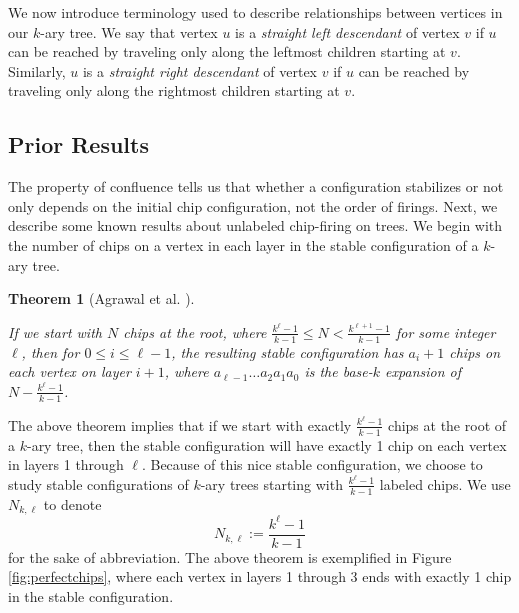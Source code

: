 \documentclass[11pt]{article}
\newtheorem{theorem}{Theorem}[section]
\theoremstyle{remark}
\theoremstyle{definition}
\begin{document}
We now introduce terminology used to describe relationships between vertices in our $k$-ary tree. We say that vertex $u$ is a \textit{straight left descendant} of vertex $v$ if $u$ can be reached by traveling only along the leftmost children starting at $v$. Similarly, $u$ is a \textit{straight right descendant} of vertex $v$ if $u$ can be reached by traveling only along the rightmost children starting at $v$.

\subsection{Prior Results}



The property of confluence tells us that whether a configuration stabilizes or not only depends on the initial chip configuration, not the order of firings. Next, we describe some known results about unlabeled chip-firing on trees. We begin with the number of chips on a vertex in each layer in the stable configuration of a $k$-ary tree.

\begin{theorem}[Agrawal et al. \cite{agrawal2025chipfiringinfinitekarytrees}]\label{endingconfig}

If we start with $N$ chips at the root, where $\frac{k^\ell-1}{k-1} \le N < \frac{k^{\ell+1}-1}{k-1}$ for some integer $\ell$, then for $0 \le i \le \ell-1$, the resulting stable configuration has $a_i+1$ chips on each vertex on layer $i+1$, where $a_{\ell-1} \ldots a_2 a_1 a_0$ is the base-$k$ expansion of $N-\frac{k^\ell-1}{k-1}$.
\end{theorem}

The above theorem implies that if we start with exactly $\frac{k^\ell-1}{k-1}$ chips at the root of a $k$-ary tree, then the stable configuration will have exactly 1 chip on each vertex in layers 1 through $\ell$. Because of this nice stable configuration, we choose to study stable configurations of $k$-ary trees starting with $\frac{k^\ell-1}{k-1}$ labeled chips. We use $N_{k, \ell}$ to denote \[N_{k, \ell}:= \frac{k^\ell-1}{k-1}\] for the sake of abbreviation. The above theorem is exemplified in Figure \ref{fig:perfectchips}, where each vertex in layers 1 through 3 ends with exactly 1 chip in the stable configuration.

\end{document}
